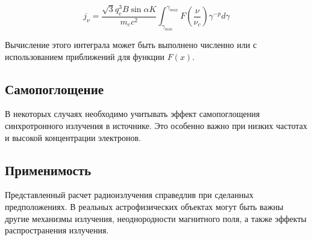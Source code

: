 \documentclass[a4paper,12pt]{extarticle}
\begin{document}
\begin{equation}
     j_\nu =  \frac{\sqrt{3} q_e^3 B \sin{\alpha} K}{m_e c^2} \int_{\gamma_{min}}^{\gamma_{max}} F\left(\frac{\nu}{\nu_c}\right) \gamma^{-p}  d\gamma
\end{equation}

Вычисление этого интеграла может быть выполнено численно или с использованием приближений для функции $F(x)$.

\subsection{Самопоглощение}
В некоторых случаях необходимо учитывать эффект самопоглощения синхротронного излучения в источнике.  Это особенно важно при низких частотах и высокой концентрации электронов.

\subsection{Применимость}

Представленный расчет радиоизлучения справедлив при сделанных предположениях.  В реальных астрофизических объектах могут быть важны другие механизмы излучения, неоднородности магнитного поля, а также эффекты распространения излучения.



\clearpage
\sloppy
\printbibliography
\end{document}
